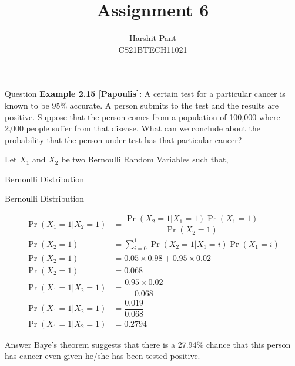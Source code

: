 \documentclass{beamer}
\title{Assignment 6}
\author[CS21BTECH11021]{Harshit Pant\\CS21BTECH11021}
\date{}
\providecommand{\pr}[1]{\ensuremath{\Pr\left(#1\right)}}
\begin{document}
\begin{frame}
    \titlepage 
\end{frame}
\begin{frame}{Question}
\textbf{Example 2.15 [Papoulis]:} A certain test for a particular cancer is known to be 95$\%$ accurate. A person submits to the test and the results are positive. Suppose that the person comes from a population of 100,000 where 2,000 people suffer from that disease. What can we conclude about the probability that the person under test has that particular cancer?
\end{frame}
\begin{frame}
Let $X_1$ and $X_2$ be two Bernoulli Random Variables such that,
\begin{table}[H]
\centering

\caption{Bernoulli Distribution}
\label{table:RV1}
\end{table}
\begin{table}[H]
\centering

\caption{Bernoulli Distribution}
\label{table:RV2}
\end{table}
\end{frame}
\begin{frame}
\begingroup
\addtolength{\jot}{.1in}
\begin{align}
\pr{X_1=1|X_2=1}&=\dfrac{\pr{X_2=1|X_1=1}\pr{X_1=1}}{\pr{X_2=1}}\\
\pr{X_2=1}&=\sum_{i=0}^1 \pr{X_2=1|X_1=i}\pr{X_1=i}\\
\pr{X_2=1}&=0.05\times0.98 +0.95\times0.02\\
\pr{X_2=1}&=0.068\\
\pr{X_1=1|X_2=1}&=\dfrac{0.95\times0.02}{0.068}\\
\pr{X_1=1|X_2=1}&=\dfrac{0.019}{0.068}\\
\pr{X_1=1|X_2=1}&=0.2794
\end{align}
\endgroup
\end{frame}
\begin{frame}{Answer}
Baye's theorem suggests that there is a 27.94$\%$ chance that this person has cancer even given he/she has been tested positive.
\end{frame}
\end{document}

